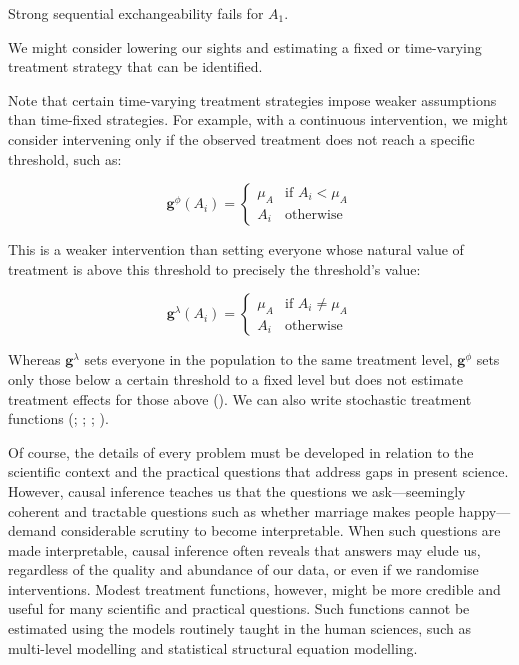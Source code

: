 \documentclass[
  single column]{article}
\begin{document}
Strong sequential exchangeability fails for \(A_1\).

We might consider lowering our sights and estimating a fixed or
time-varying treatment strategy that can be identified.

Note that certain time-varying treatment strategies impose weaker
assumptions than time-fixed strategies. For example, with a continuous
intervention, we might consider intervening only if the observed
treatment does not reach a specific threshold, such as:

\[
\mathbf{g}^{\phi} (A_i) = \begin{cases}  
\mu_A & \text{if } A_i < \mu_A \\ 
A_i & \text{otherwise} 
\end{cases}
\]

This is a weaker intervention than setting everyone whose natural value
of treatment is above this threshold to precisely the threshold's value:

\[
\mathbf{g}^{\lambda} (A_i) = \begin{cases}   
\mu_A & \text{if } A_i \neq \mu_A \\ 
A_i & \text{otherwise} 
\end{cases}
\]

Whereas \(\mathbf{g}^{\lambda}\) sets everyone in the population to the
same treatment level, \(\mathbf{g}^{\phi}\) sets only those below a
certain threshold to a fixed level but does not estimate treatment
effects for those above (). We can also write stochastic treatment functions
(;
;
;
).

Of course, the details of every problem must be developed in relation to
the scientific context and the practical questions that address gaps in
present science. However, causal inference teaches us that the questions
we ask---seemingly coherent and tractable questions such as whether
marriage makes people happy---demand considerable scrutiny to become
interpretable. When such questions are made interpretable, causal
inference often reveals that answers may elude us, regardless of the
quality and abundance of our data, or even if we randomise
interventions. Modest treatment functions, however, might be more
credible and useful for many scientific and practical questions. Such
functions cannot be estimated using the models routinely taught in the
human sciences, such as multi-level modelling and statistical structural
equation modelling.
\end{document}
